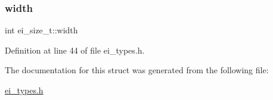 \subsubsection{\texorpdfstring{width}{width}}
{\footnotesize\ttfamily int ei\+\_\+size\+\_\+t\+::width}



Definition at line 44 of file ei\+\_\+types.\+h.



The documentation for this struct was generated from the following file\+:\begin{DoxyCompactItemize}
\item 
\hyperlink{ei__types_8h}{ei\+\_\+types.\+h}\end{DoxyCompactItemize}
